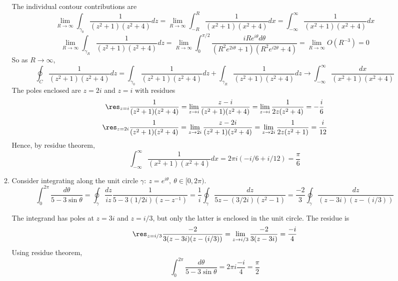 \documentclass[a4paper]{article}
\begin{document}
\begin{ans}
\begin{enumerate}[label=(\alph*)]
\begin{enumerate}[label=(\roman*)]
\begin{center}
  \end{center}
The individual contour contributions are
$$\lim_{R\rightarrow\infty}\int_{\gamma_0}\frac{1}{(z^2+1)(z^2+4)}dz=\lim_{R\rightarrow\infty}\int_{-R}^R\frac{1}{(x^2+1)(x^2+4)}dx=\int_{-\infty}^\infty\frac{1}{(x^2+1)(x^2+4)}dx$$
$$\lim_{R\rightarrow\infty}\int_{\gamma_R}\frac{1}{(z^2+1)(z^2+4)}dz=\lim_{R\rightarrow\infty}\int_0^{\pi/2}\frac{iRe^{i\theta}d\theta}{(R^2e^{2i\theta}+1)(R^2e^{i2\theta}+4)}=\lim_{R\rightarrow\infty}O(R^{-3})=0$$
So as $R\rightarrow\infty$,
$$\oint_C\frac{1}{(z^2+1)(z^2+4)}dz=\int_{\gamma_0}\frac{1}{(z^2+1)(z^2+4)}dz+\int_{\gamma_R}\frac{1}{(z^2+1)(z^2+4)}dz\rightarrow\int_{-\infty}^\infty\frac{dx}{(x^2+1)(x^2+4)}$$
The poles enclosed are $z=2i$ and $z=i$ with residues
$$\res_{z=i}\frac{1}{(z^2+1)(z^2+4)}=\lim_{z\rightarrow i}\frac{z-i}{(z^2+1)(z^2+4)}=\lim_{z\rightarrow i}\frac{1}{2z(z^2+4)}=-\frac{i}{6}$$
$$\res_{z=2i}\frac{1}{(z^2+1)(z^2+4)}=\lim_{z\rightarrow 2i}\frac{z-2i}{(z^2+1)(z^2+4)}=\lim_{z\rightarrow 2i}\frac{1}{2z(z^2+1)}=\frac{i}{12}$$
Hence, by residue theorem,
$$\int_{-\infty}^\infty \frac{1}{(x^2+1)(x^2+4)}dx=2\pi i(-i/6+i/12)=\frac{\pi}{6}$$
\item Consider integrating along the unit circle $\gamma:~z=e^{i\theta},~\theta\in[0,2\pi)$. 
$$\int_0^{2\pi}\frac{d\theta}{5-3\sin\theta}=\oint_\gamma\frac{dz}{iz}\frac{1}{5-3(1/2i)(z-z^{-1})}=\frac{1}{i}\oint_\gamma\frac{dz}{5z-(3/2i)(z^2-1)}=\frac{-2}{3}\oint_\gamma\frac{dz}{(z-3i)(z-(i/3))}$$
 \begin{center}
  \end{center}
  The integrand has poles at $z=3i$ and $z=i/3$, but only the latter is enclosed in the unit circle. The residue is
  $$\res_{z=i/3}\frac{-2}{3(z-3i)(z-(i/3))}=\lim_{z\rightarrow i/3}\frac{-2}{3(z-3i)}=\frac{-i}{4}$$
  Using residue theorem,
  $$\int_0^{2\pi}\frac{d\theta}{5-3\sin\theta}=2\pi i\frac{-i}{4}=\frac{\pi}{2}$$
 \end{enumerate}
\end{enumerate}
\end{ans}
\end{document}
